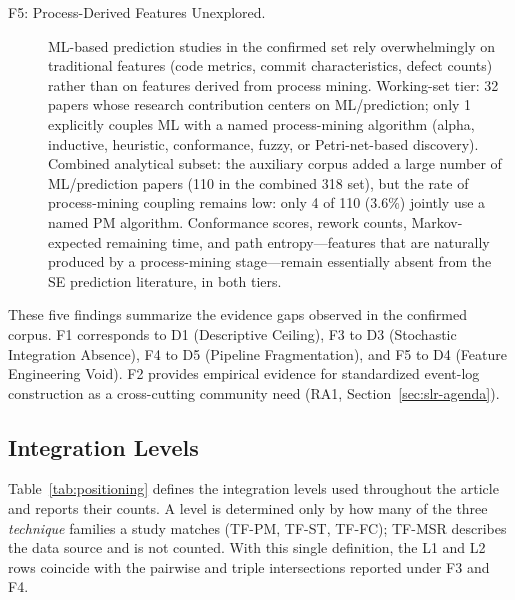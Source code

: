 \begin{description}
\item[F5: Process-Derived Features Unexplored.]
ML-based prediction studies in the confirmed set rely overwhelmingly on
traditional features (code metrics, commit characteristics, defect counts)
rather than on features derived from process mining. Working-set tier: 32
papers whose research contribution centers on ML/prediction; only 1
explicitly couples ML with a named process-mining algorithm (alpha,
inductive, heuristic, conformance, fuzzy, or Petri-net-based discovery).
Combined analytical subset: the auxiliary corpus added a large number of ML/prediction
papers (110 in the combined 318 set), but the rate of process-mining
coupling remains low: only 4 of 110 (3.6\%) jointly use a named PM
algorithm. Conformance scores, rework counts, Markov-expected remaining
time, and path entropy---features that are naturally produced by a
process-mining stage---remain essentially absent from the SE prediction
literature, in both tiers.

\end{description}

These five findings summarize the evidence gaps observed in the confirmed
corpus. F1 corresponds to D1 (Descriptive Ceiling), F3 to D3 (Stochastic
Integration Absence), F4 to D5 (Pipeline Fragmentation), and F5 to D4
(Feature Engineering Void). F2 provides empirical evidence for standardized
event-log construction as a cross-cutting community need (RA1,
Section~\ref{sec:slr-agenda}).


\subsection{Integration Levels}
\label{sec:slr-positioning}

Table~\ref{tab:positioning} defines the integration levels used throughout
the article and reports their counts. A level is determined only by how many
of the three \emph{technique} families a study matches (TF-PM, TF-ST,
TF-FC); TF-MSR describes the data source and is not counted. With this
single definition, the L1 and L2 rows coincide with the pairwise and triple
intersections reported under F3 and F4.

